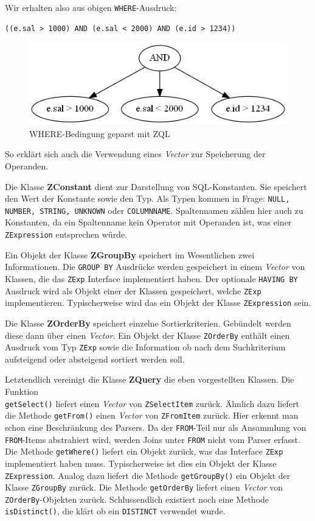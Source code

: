 Wir erhalten also aus obigen \verb|WHERE|-Ausdruck:
\begin{verbatim}
((e.sal > 1000) AND (e.sal < 2000) AND (e.id > 1234))
\end{verbatim}

\begin{figure}
\includegraphics[scale=0.7]{Bilder/with_zql.png}
\caption{WHERE-Bedingung geparst mit ZQL}
\end{figure}

So erklärt sich auch die Verwendung eines \textit{Vector} zur Speicherung der Operanden.

Die Klasse \textbf{ZConstant} dient zur Darstellung von SQL-Konstanten. Sie speichert den Wert der Konstante sowie den Typ. Als Typen kommen in Frage: \verb|NULL, NUMBER, STRING, UNKNOWN| oder \verb|COLUMNNAME|. Spaltennamen zählen hier auch zu Konstanten, da ein Spaltenname kein Operator mit Operanden ist, was einer \verb|ZExpression| entsprechen würde.

Ein Objekt der Klasse \textbf{ZGroupBy} speichert im Wesentlichen zwei Informationen. Die \verb|GROUP BY| Ausdrücke werden gespeichert in einem \textit{Vector} von Klassen, die das \verb|ZExp| Interface implementiert haben. Der optionale \verb|HAVING BY| Ausdruck wird als Objekt einer der Klassen gespeichert, welche \verb|ZExp| implementieren. Typischerweise wird das ein Objekt der Klasse \verb|ZExpression| sein.

Die Klasse \textbf{ZOrderBy} speichert einzelne Sortierkriterien. Gebündelt werden diese dann über einen \textit{Vector}. Ein Objekt der Klasse \verb|ZOrderBy| enthält einen Ausdruck vom Typ \verb|ZExp| sowie die Information ob nach dem Suchkriterium aufsteigend oder absteigend sortiert werden soll.

Letztendlich vereinigt die Klasse \textbf{ZQuery} die eben vorgestellten Klassen. Die Funktion \\\verb|getSelect()| liefert einen \textit{Vector} von \verb|ZSelectItem| zurück. Ähnlich dazu liefert die Methode \verb|getFrom()| einen \textit{Vector} von \verb|ZFromItem| zurück. Hier erkennt man schon eine Beschränkung des Parsers. Da der \verb|FROM|-Teil nur als Ansammlung von \verb|FROM|-Items abstrahiert wird, werden Joins unter \verb|FROM| nicht vom Parser erfasst. Die Methode \verb|getWhere()| liefert ein Objekt zurück, was das Interface \verb|ZExp| implementiert haben muss. Typischerweise ist dies ein Objekt der Klasse \verb|ZExpression|. Analog dazu liefert die Methode \verb|getGroupBy()| ein Objekt der Klasse \verb|ZGroupBy| zurück. Die Methode \verb|getOrderBy| liefert einen \textit{Vector} von \verb|ZOrderBy|-Objekten zurück.
Schlussendlich existiert noch eine Methode \verb|isDistinct()|, die klärt ob ein \verb|DISTINCT| verwendet wurde.

